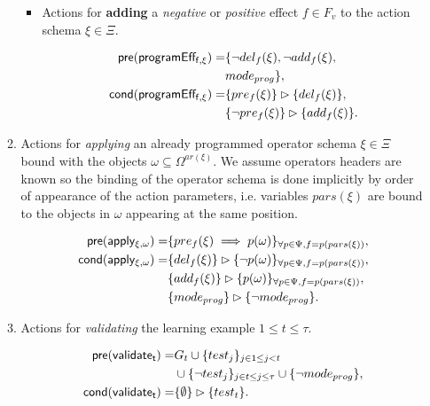 \documentclass{article}
\newcommand{\pre}{\mathsf{pre}}     %
\newcommand{\cond}{\mathsf{cond}}   %
\begin{document}
\begin{itemize}
\begin{enumerate}
\begin{itemize}
\item Actions for {\bf adding} a {\em negative} or {\em positive} effect $f\in F_v$ to the action schema $\xi\in\Xi$.

\begin{small}
\begin{align*}
\hspace*{7pt}\pre(\mathsf{programEff_{f,\xi}})=&\{\neg del_{f}(\xi),\neg add_{f}(\xi),\\
& mode_{prog}\},\\
\cond(\mathsf{programEff_{f,\xi}})=&\{pre_{f}(\xi)\}\rhd\{del_{f}(\xi)\},\\
&\{\neg pre_{f}(\xi)\}\rhd\{add_{f}(\xi)\}.
\end{align*}
\end{small}
\end{itemize}

\item Actions for {\em applying} an already programmed operator schema $\xi\in\Xi$ bound with the objects $\omega\subseteq\Omega^{ar(\xi)}$. We assume operators headers are known so the binding of the operator schema is done implicitly by order of appearance of the action parameters, i.e. variables $pars(\xi)$ are bound to the objects in $\omega$ appearing at the same position. 
\begin{small}
\begin{align*}
\hspace*{7pt}\pre(\mathsf{apply_{\xi,\omega}})=&\{pre_{f}(\xi)\implies p(\omega)\}_{\forall p\in\Psi,f=p(pars(\xi))},\\
\cond(\mathsf{apply_{\xi,\omega}})=&\{del_{f}(\xi)\}\rhd\{\neg p(\omega)\}_{\forall p\in\Psi,f=p(pars(\xi))},\\
&\{add_{f}(\xi)\}\rhd\{p(\omega)\}_{\forall p\in\Psi,f=p(pars(\xi))},\\
&\{mode_{prog}\}\rhd\{\neg mode_{prog}\}.
\end{align*}
\end{small}

\item Actions for {\em validating} the learning example {\tt\small $1\leq t\leq \tau$}.
\begin{small}
\begin{align*}
\hspace*{7pt}\pre(\mathsf{validate_{t}})=&G_t\cup\{test_j\}_{j\in 1\leq j<t}\\
&\cup\{\neg test_j\}_{j\in t\leq j\leq \tau}\cup \{\neg mode_{prog}\},\\
\cond(\mathsf{validate_{t}})=&\{\emptyset\}\rhd\{test_t\}.
\end{align*}
\end{small}
\end{enumerate}
\end{itemize}
\end{document}

